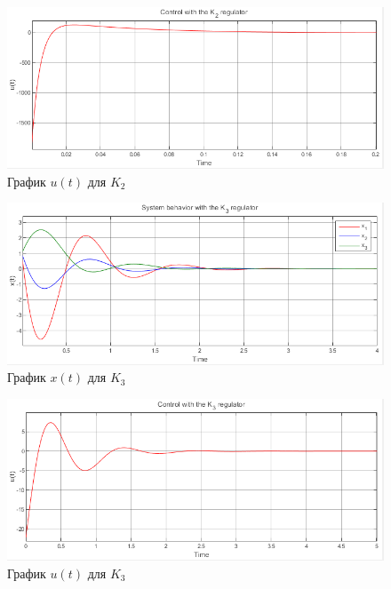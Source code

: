\documentclass[a4paper, 12pt]{article}
\begin{document}
    \begin{figure}[H]
        \centering
        \includegraphics[scale=0.7]{1task_ut_k2.png}
        \captionsetup{skip=0pt}
        \caption{График $u(t)$ для $K_2$}
        \label{fig:1task_ut_k2}
    \end{figure}
    \begin{figure}[H]
        \centering
        \includegraphics[scale=0.7]{1task_xt_k3.png}
        \captionsetup{skip=0pt}
        \caption{График $x(t)$ для $K_3$}
        \label{fig:1task_xt_k3}
    \end{figure}
    \begin{figure}[H]
        \centering
        \includegraphics[scale=0.7]{1task_ut_k3.png}
        \captionsetup{skip=0pt}
        \caption{График $u(t)$ для $K_3$}
        \label{fig:1task_ut_k3}
    \end{figure}
\end{document}
